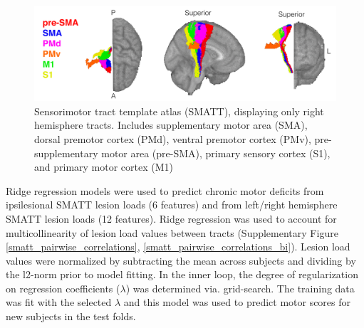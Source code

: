 \documentclass[10pt]{article}
\begin{document}
\begin{figure}[ht]
    \centering
    \includegraphics[width=1\linewidth]{figures/SMATT.png}
    \caption{Sensorimotor tract template atlas (SMATT), displaying only right hemisphere tracts. Includes supplementary motor area (SMA), dorsal premotor cortex (PMd), ventral premotor cortex (PMv), pre-supplementary motor area (pre-SMA), primary sensory cortex (S1),  and primary motor cortex (M1)}
    \label{smatt}
\end{figure}


Ridge regression models were used to predict chronic motor deficits from ipsilesional SMATT lesion loads (6 features) and from left/right hemisphere SMATT lesion loads (12 features). Ridge regression was used to account for multicollinearity of lesion load values between tracts (Supplementary Figure \ref{smatt_pairwise_correlations}, \ref{smatt_pairwise_correlations_bi}). Lesion load values were normalized by subtracting the mean across subjects and dividing by the l2-norm prior to model fitting. In the inner loop, the degree of regularization on regression coefficients ($\lambda$) was determined via. grid-search. The training data was fit with the selected $\lambda$ and this model was used to predict motor scores for new subjects in the test folds.
\end{document}

